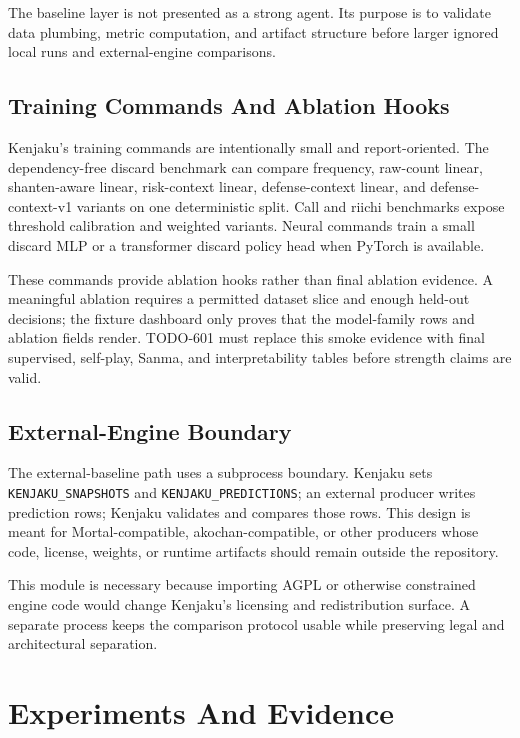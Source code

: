 \documentclass[11pt]{article}
\begin{document}
The baseline layer is not presented as a strong agent. Its purpose is to validate data plumbing,
metric computation, and artifact structure before larger ignored local runs and external-engine
comparisons.

\subsection{Training Commands And Ablation Hooks}

Kenjaku's training commands are intentionally small and report-oriented. The dependency-free
discard benchmark can compare frequency, raw-count linear, shanten-aware linear, risk-context
linear, defense-context linear, and defense-context-v1 variants on one deterministic split. Call
and riichi benchmarks expose threshold calibration and weighted variants. Neural commands train a
small discard MLP or a transformer discard policy head when PyTorch is available.

These commands provide ablation hooks rather than final ablation evidence. A meaningful ablation
requires a permitted dataset slice and enough held-out decisions; the fixture dashboard only proves
that the model-family rows and ablation fields render. TODO-601 must replace this smoke evidence
with final supervised, self-play, Sanma, and interpretability tables before strength claims are
valid.

\subsection{External-Engine Boundary}

The external-baseline path uses a subprocess boundary. Kenjaku sets \texttt{KENJAKU\_SNAPSHOTS}
and \texttt{KENJAKU\_PREDICTIONS}; an external producer writes prediction rows; Kenjaku validates
and compares those rows. This design is meant for Mortal-compatible, akochan-compatible, or other
producers whose code, license, weights, or runtime artifacts should remain outside the repository.

This module is necessary because importing AGPL or otherwise constrained engine code would change
Kenjaku's licensing and redistribution surface. A separate process keeps the comparison protocol
usable while preserving legal and architectural separation.

\section{Experiments And Evidence}
\end{document}
